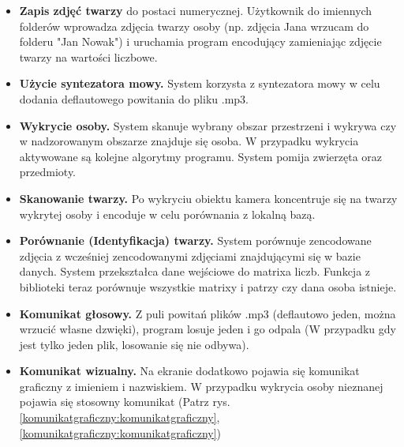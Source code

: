 \documentclass[a4paper,12pt,reqno]{article}
\begin{document}
\begin{itemize}
	\item \textcolor{edited}{\textbf{Zapis zdjęć twarzy} do postaci numerycznej. Użytkownik do imiennych folderów wprowadza zdjęcia twarzy osoby (np. zdjęcia Jana wrzucam do folderu "Jan Nowak") i uruchamia program encodujący zamieniając zdjęcie twarzy na wartości liczbowe.}
	\item \textbf{Użycie syntezatora mowy.} System korzysta z syntezatora mowy w celu dodania deflautowego powitania do pliku \textcolor{to_check_at_end}{.mp3.}
	\item \textbf{Wykrycie osoby.} System skanuje wybrany obszar przestrzeni i wykrywa czy w nadzorowanym obszarze znajduje się osoba. W przypadku wykrycia aktywowane są kolejne algorytmy programu. System pomija zwierzęta oraz przedmioty.
	\item \textbf{Skanowanie  twarzy.} Po wykryciu obiektu kamera koncentruje się na twarzy wykrytej osoby i encoduje w celu porównania z lokalną bazą.
	\item \textbf{Porównanie (Identyfikacja) twarzy.} \textcolor{edited}{System porównuje zencodowane zdjęcia z wcześniej zencodowanymi zdjęciami znajdującymi się w \textcolor{to_change}{bazie danych}. System przekształca dane wejściowe \textcolor{new}{do matrixa liczb. Funkcja z biblioteki teraz porównuje wszystkie matrixy i patrzy czy dana osoba istnieje.}}
	\item \textbf{Komunikat głosowy.} Z puli powitań plików \textcolor{to_check_at_end}{.mp3} (deflautowo jeden, można wrzucić własne dzwięki), program losuje jeden i go odpala (W przypadku gdy jest tylko jeden plik, losowanie się nie odbywa).
	\item \textbf{Komunikat wizualny.} Na ekranie dodatkowo pojawia się komunikat graficzny z imieniem i nazwiskiem. W przypadku wykrycia osoby nieznanej pojawia się stosowny komunikat (Patrz rys. \ref{komunikatgraficzny:komunikatgraficzny}, \ref{komunikatgraficzny:komunikatgraficzny})
\end{itemize}
\end{document}
